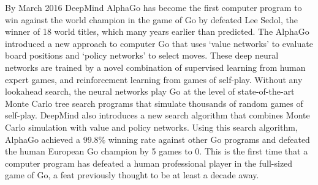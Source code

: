 \documentclass[12pt,a4paper]{article}
\begin{document}
{
\hspace{0.6cm} By March 2016 DeepMind AlphaGo has become the first computer program to win against the world champion in the game of Go by defeated Lee Sedol, the winner of 18 world titles, which many years earlier than predicted\cite{GovsCom}\cite{AGWeb}. The AlphaGo introduced a new approach to computer Go that uses ‘value networks’ to evaluate board positions and ‘policy networks’ to select moves. These deep neural networks are trained by a novel combination of supervised learning from human expert games, and reinforcement learning from games of self-play. Without any lookahead search, the neural networks play Go at the level of state-of-the-art Monte Carlo tree search programs that simulate thousands of random games of self-play. DeepMind also introduces a new search algorithm that combines Monte Carlo simulation with value and policy networks. Using this search algorithm, AlphaGo achieved a 99.8\% winning rate against other Go programs and defeated the human European Go champion by 5 games to 0. This is the first time that a computer program has defeated a human professional player in the full-sized game of Go, a feat previously thought to be at least a decade away\cite{AlphaGo}.\par
}
\end{document}
